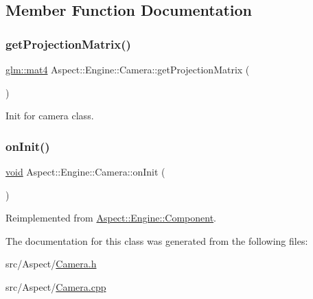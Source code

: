 \subsection{Member Function Documentation}
\mbox{\label{class_aspect_1_1_engine_1_1_camera_a044257842c27ddee66a901adb5ca828d}} 
\subsubsection{\texorpdfstring{get\+Projection\+Matrix()}{getProjectionMatrix()}}
{\footnotesize\ttfamily \mbox{\hyperlink{group__core__types_ga7dcd2365c2e368e6af5b7adeb6a9c8df}{glm\+::mat4}} Aspect\+::\+Engine\+::\+Camera\+::get\+Projection\+Matrix (\begin{DoxyParamCaption}{ }\end{DoxyParamCaption})}



Init for camera class. 

\mbox{\label{class_aspect_1_1_engine_1_1_camera_a30e0d0ecb4c5c9fd43cfe8323e600d17}} 
\subsubsection{\texorpdfstring{on\+Init()}{onInit()}}
{\footnotesize\ttfamily \mbox{\hyperlink{_s_d_l__opengles2__gl2ext_8h_ae5d8fa23ad07c48bb609509eae494c95}{void}} Aspect\+::\+Engine\+::\+Camera\+::on\+Init (\begin{DoxyParamCaption}{ }\end{DoxyParamCaption})\hspace{0.3cm}{\ttfamily [virtual]}}



Reimplemented from \mbox{\hyperlink{class_aspect_1_1_engine_1_1_component_a3a1fbf76e3fd208be7ffe0ffa449dcf9}{Aspect\+::\+Engine\+::\+Component}}.



The documentation for this class was generated from the following files\+:\begin{DoxyCompactItemize}
\item 
src/\+Aspect/\mbox{\hyperlink{_camera_8h}{Camera.\+h}}\item 
src/\+Aspect/\mbox{\hyperlink{_camera_8cpp}{Camera.\+cpp}}\end{DoxyCompactItemize}
